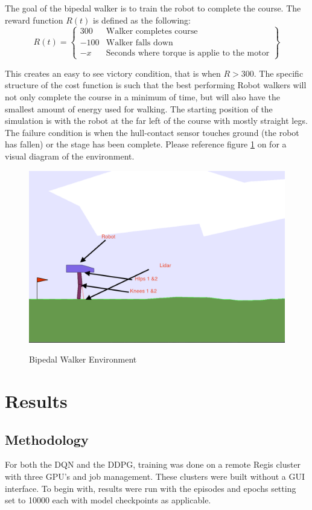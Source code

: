 \documentclass[doc, onecolumn, 12pt]{apa6}
\begin{document}
The goal of the bipedal walker is to train the robot to complete the course. The reward function $R(t)$ is defined as the following: 
\[ R(t) = \left \{\begin{array}{lr}
 300 & \text{Walker completes course} \\
 -100 & \text{Walker falls down} \\
 -x & \text{Seconds where torque is applie to the motor} 
\end{array}\right\}  \]

This creates an easy to see victory condition, that is when $R> 300$. The specific structure of the cost function is such that the best performing Robot walkers will not only complete the course in a minimum of time, but will also have the smallest amount of energy used for walking.
The starting position of the simulation is with the robot at the far left of the course with mostly straight legs. The failure condition is when the hull-contact sensor touches ground (the robot has fallen) or the stage has been complete.  Please reference figure \ref{biped}  on \pageref{biped} for a visual diagram of the environment. 

\begin{figure}[H]

\caption{Bipedal Walker Environment}
\includegraphics[width = \textwidth]{bipedal.png}
\label{biped}
\end{figure} 
\FloatBarrier
\clearpage
\section{Results}
\subsection{Methodology}
For both the DQN and the DDPG, training was done on a remote Regis cluster with three GPU's and job management. These clusters were built without a GUI interface. To begin with, results were run with the episodes and epochs setting set to 10000 each with model checkpoints as applicable.
\end{document}
